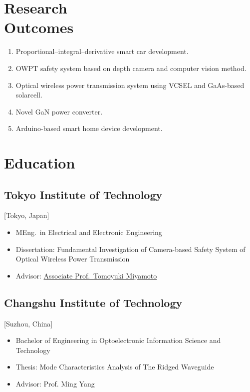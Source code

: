 \documentclass{mycv}
\begin{document}
\section{Research \\ Outcomes}

\begin{enumerate}
  \item Proportional–integral–derivative smart car development. 
  \item OWPT safety system based on depth camera and computer vision method. 
  \item Optical wireless power transmission system using VCSEL and GaAs-based solarcell. 
  \item Novel GaN power converter. 
  \item Arduino-based smart home device development. 
\end{enumerate}

\section{Education}

\subsection{Tokyo Institute of Technology}[Tokyo, Japan]
\vspace{-\parskip}%
\begin{itemize}[label={}]	
  \item MEng.\ in Electrical and Electronic Engineering 
  \item Dissertation: {Fundamental Investigation of Camera-based Safety System of Optical Wireless Power Transmission} %
  \item Advisor: \href{https://www.first.iir.titech.ac.jp/member/core3.html#miyamoto}{Associate Prof.~Tomoyuki Miyamoto}
\end{itemize}

\subsection{Changshu Institute of Technology}[Suzhou, China]
\vspace{-\parskip}%
\begin{itemize}[label={}]
  \item Bachelor of Engineering in Optoelectronic Information Science and Technology  \\ 
  \item Thesis: {Mode Characteristics Analysis of The Ridged Waveguide}
  \item Advisor: Prof. Ming Yang
\end{itemize}
\end{document}
